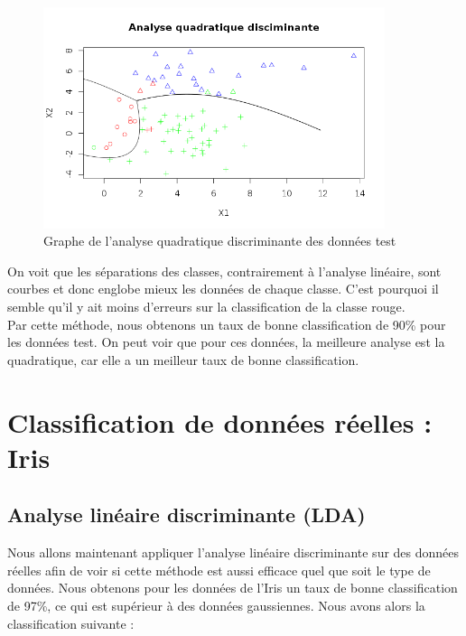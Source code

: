 \documentclass[a4paper,11pt]{article}
\begin{document}
  \begin{figure}[H]
   \centering
   \includegraphics[width=10cm]{quadratique.png}
   \caption{Graphe de l'analyse quadratique discriminante des données test}
  \end{figure}
  
  On voit que les séparations des classes, contrairement à l'analyse
  linéaire, sont courbes et donc englobe mieux les données de chaque
  classe. C'est pourquoi il semble qu'il y ait moins d'erreurs sur la
  classification de la classe rouge.\\
  
  Par cette méthode, nous obtenons un taux de bonne classification de
  90\% pour les données test.  On peut voir que pour ces données, la
  meilleure analyse est la quadratique, car elle a un meilleur taux de
  bonne classification.
  
  \section{Classification de données réelles : Iris}
  
  \subsection{Analyse linéaire discriminante (LDA)}
  
  Nous allons maintenant appliquer l'analyse linéaire discriminante
  sur des données réelles afin de voir si cette méthode est aussi
  efficace quel que soit le type de données. Nous obtenons pour les
  données de l'Iris un taux de bonne classification de 97\%, ce qui
  est supérieur à des données gaussiennes. Nous avons alors la
  classification suivante :\\
  
\end{document}
